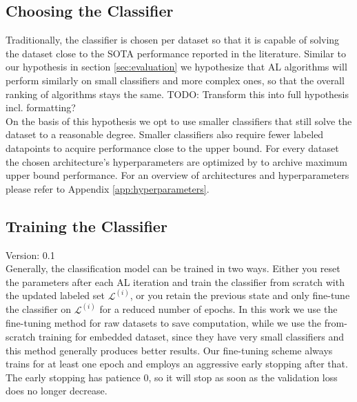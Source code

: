 \documentclass[]{article}
\begin{document}
\subsection{Choosing the Classifier}\label{sec:choosing_the_classifier}
Traditionally, the classifier is chosen per dataset so that it is capable of solving the dataset close to the SOTA performance reported in the literature.
Similar to our hypothesis in section \ref{sec:evaluation} we hypothesize that AL algorithms will perform similarly on small classifiers and more complex ones, so that the overall ranking of algorithms stays the same.
{\color{red} TODO: Transform this into full hypothesis incl. formatting?}\\
On the basis of this hypothesis we opt to use smaller classifiers that still solve the dataset to a reasonable degree.
Smaller classifiers also require fewer labeled datapoints to acquire performance close to the upper bound.
For every dataset the chosen architecture's hyperparameters are optimized by to archive maximum upper bound performance.
For an overview of architectures and hyperparameters please refer to Appendix \ref{app:hyperparameters}.


\subsection{Training the Classifier}\label{sec:training_the_classifier}
{\color{red} Version: 0.1}\\
Generally, the classification model can be trained in two ways. Either you reset the parameters after each AL iteration and train the classifier from scratch with the updated labeled set $\mathcal{L}^{(i)}$, or you retain the previous state and only fine-tune the classifier on $\mathcal{L}^{(i)}$ for a reduced number of epochs.
In this work we use the fine-tuning method for raw datasets to save computation, while we use the from-scratch training for embedded dataset, since they have very small classifiers and this method generally produces better results.
Our fine-tuning scheme always trains for at least one epoch and employs an aggressive early stopping after that.
The early stopping has patience 0, so it will stop as soon as the validation loss does no longer decrease.

\end{document}
